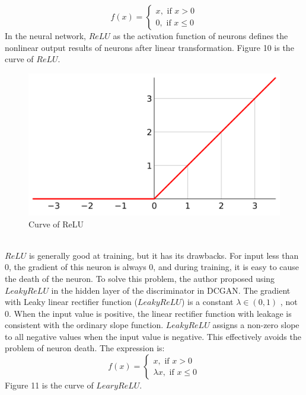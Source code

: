 \documentclass[11pt,a4paper]{article}
\begin{document}
$$
f(x)=\left\{\begin{array}{l}{x, \text { if } x>0} \\ {0, \text { if } x \leq 0}\end{array}\right.
$$
In the neural network, $ReLU$ as the activation function of neurons defines the nonlinear output results of neurons after linear transformation. Figure 10 is the curve of $ReLU$.
\begin{figure}[ht!]
\centering
\includegraphics[scale=0.15]{10.png}
\caption{Curve of ReLU}
\label{fig:Curve of ReLU}
\end{figure}
\\
$ReLU$ is generally good at training, but it has its drawbacks. For input less than 0, the gradient of this neuron is always 0, and during training, it is easy to cause the death of the neuron. To solve this problem, the author proposed using $Leaky ReLU$ in the hidden layer of the discriminator in DCGAN\citep{radford2015unsupervised}. The gradient with Leaky linear rectifier function ($Leaky ReLU$) is a constant $\lambda \in(0,1)$ , not 0. When the input value is positive, the linear rectifier function with leakage is consistent with the ordinary slope function. $Leaky ReLU$ assigns a non-zero slope to all negative values when the input value is negative. This effectively avoids the problem of neuron death. The expression is: 
$$
f(x)=\left\{\begin{array}{l}{x, \text { if } x>0} \\ {\lambda x, \text { if } x \leq 0}\end{array}\right.
$$
Figure 11 is the curve of $Leary ReLU$.
\end{document}
